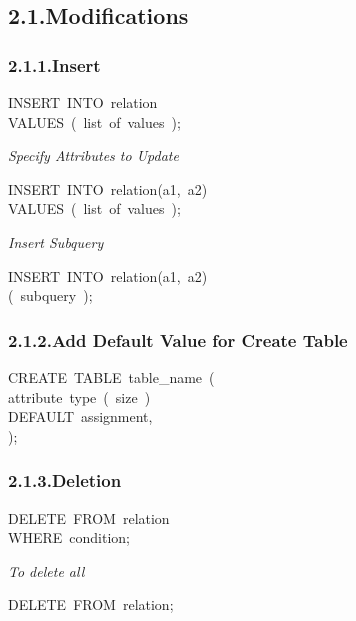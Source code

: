 \documentclass{article}
\begin{document}
\subsection{2.1.\hspace*{0.5em}Modifications}\label{sec-modifications}%

\subsubsection{2.1.1.\hspace*{0.5em}Insert}\label{sec-insert}%
\begin{mdpre}%
\noindent INSERT~INTO~relation\\
VALUES~(~list~of~values~);%
\end{mdpre}\noindent{}\emph{Specify Attributes to Update}
\begin{mdpre}%
\noindent INSERT~INTO~relation(a1,~a2)\\
VALUES~(~list~of~values~);%
\end{mdpre}\noindent{}\emph{Insert Subquery}
\begin{mdpre}%
\noindent INSERT~INTO~relation(a1,~a2)\\
(~subquery~);%
\end{mdpre}
\subsubsection{2.1.2.\hspace*{0.5em}Add Default Value for Create Table}\label{sec-add-default-value-for-create-table}%
\begin{mdpre}%
\noindent CREATE~TABLE~table\_name~(\\
attribute~type~(~size~)\\
DEFAULT~assignment,\\
);%
\end{mdpre}
\subsubsection{2.1.3.\hspace*{0.5em}Deletion}\label{sec-deletion}%
\begin{mdpre}%
\noindent DELETE~FROM~relation\\
WHERE~condition;%
\end{mdpre}\noindent{}\emph{To delete all}
\begin{mdpre}%
\noindent DELETE~FROM~relation;%
\end{mdpre}
\end{document}
